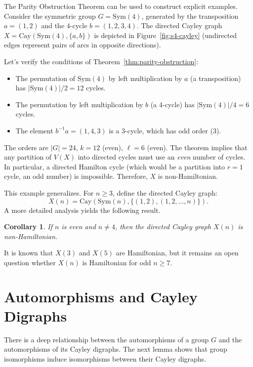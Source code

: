 \documentclass[12pt,a4paper,openany]{book}
\newtheorem{corollary}{Corollary}[section]
\begin{document}
The Parity Obstruction Theorem can be used to construct explicit examples. Consider the symmetric group $G = \mathrm{Sym}(4)$, generated by the transposition $a = (1,2)$ and the $4$-cycle $b = (1,2,3,4)$. The directed Cayley graph $X = \mathrm{Cay}(\mathrm{Sym}(4), \{a, b\})$ is depicted in Figure~\ref{fig:s4-cayley} (undirected edges represent pairs of arcs in opposite directions).

Let's verify the conditions of Theorem~\ref{thm:parity-obstruction}:
\begin{itemize}
    \item The permutation of $\mathrm{Sym}(4)$ by left multiplication by $a$ (a transposition) has $|\mathrm{Sym}(4)|/2 = 12$ cycles.
    \item The permutation by left multiplication by $b$ (a $4$-cycle) has $|\mathrm{Sym}(4)|/4 = 6$ cycles.
    \item The element $b^{-1}a = (1,4,3)$ is a $3$-cycle, which has odd order ($3$).
\end{itemize}
The orders are $|G|=24$, $k=12$ (even), $\ell=6$ (even). The theorem implies that any partition of $V(X)$ into directed cycles must use an \emph{even} number of cycles. In particular, a directed Hamilton cycle (which would be a partition into $r=1$ cycle, an odd number) is impossible. Therefore, $X$ is non-Hamiltonian.

This example generalizes. For $n \ge 3$, define the directed Cayley graph:
\[
X(n) = \mathrm{Cay}(\mathrm{Sym}(n), \{ (1,2), (1,2,\dots,n) \}).
\]
A more detailed analysis yields the following result.

\begin{corollary}
If $n$ is even and $n \ne 4$, then the directed Cayley graph $X(n)$ is non-Hamiltonian.
\end{corollary}

It is known that $X(3)$ and $X(5)$ are Hamiltonian, but it remains an open question whether $X(n)$ is Hamiltonian for odd $n \ge 7$.

\section{Automorphisms and Cayley Digraphs}

There is a deep relationship between the automorphisms of a group $G$ and the automorphisms of its Cayley digraphs. The next lemma shows that group isomorphisms induce isomorphisms between their Cayley digraphs.
\end{document}
